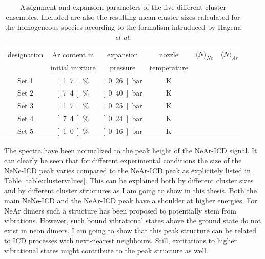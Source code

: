 \begin{table}[!h]
 \centering
 \caption{Assignment and expansion parameters of the five different
          cluster ensembles. Included are also the resulting mean
          cluster sizes calculated for the homogeneous species according
          to the formalism intruduced by Hagena \it{et al.}
          \cite{Hagena72}}
  \begin{tabular}{c c c c c c}
          \toprule
           designation    &       Ar content in   & expansion & nozzle & $\langle N\rangle _{Ne}$ & $\langle N\rangle _{Ar}$ \\
                                          &       initial mixture &  pressure & temperature & &  \\
          \midrule
          Set 1   &       \unit[1.7]{\%}  &       \unit[0.26]{bar}        &       \unit[63]{K}    &       \unit[5]        &       \unit[520]      \\
          Set 2   &       \unit[7.4]{\%}  &       \unit[0.40]{bar}        &       \unit[60]{K}    &       \unit[17]       &       \unit[1850] \\
          Set 3   &       \unit[1.7]{\%}  &       \unit[0.25]{bar}        &       \unit[57]{K}    &       \unit[7]        &       \unit[810]  \\
          Set 4   &       \unit[7.4]{\%}  &       \unit[0.24]{bar}        &       \unit[58]{K}    &       \unit[6]        &       \unit[670]  \\
          Set 5   &       \unit[1.0]{\%}  &       \unit[0.16]{bar}        &       \unit[54]{K}    &       \unit[3]        &       \unit[380]  \\
          \bottomrule
  \end{tabular}
\label{table:expansion_conditions}
\end{table}

The spectra have been normalized to the peak height of the NeAr-ICD signal.
It can clearly be seen that for different experimental conditions the
size of the NeNe-ICD peak varies compared to the NeAr-ICD peak as explicitely
listed in Table \ref{table:clustervalues}. This can be
explained both by different cluster sizes and by different cluster structures
as I am going to show in this thesis. Both the main NeNe-ICD and the NeAr-ICD peak
have a shoulder at higher energies. For NeAr dimers such a structure has
been proposed to potentially stem from vibrations. However, such bound vibrational
states above the ground state do not exist in neon dimers. I am going to show
that this peak structure can be related to \ac{ICD} processes with next-nearest
neighbours. Still, excitations to higher vibrational states might contribute
to the peak structure as well.

